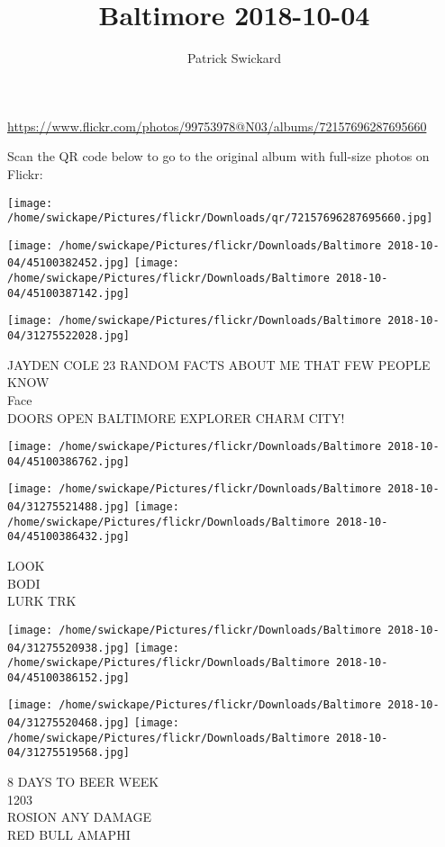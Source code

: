 \documentclass[10pt,letterpaper]{article}
\title{Baltimore 2018-10-04}
\author{Patrick Swickard}
\date{}
\begin{document}
\maketitle

\url{https://www.flickr.com/photos/99753978@N03/albums/72157696287695660}

Scan the QR code below to go to the original album with full-size photos on Flickr:

\texttt{[image: /home/swickape/Pictures/flickr/Downloads/qr/72157696287695660.jpg]}
\pagebreak

\texttt{[image: /home/swickape/Pictures/flickr/Downloads/Baltimore 2018-10-04/45100382452.jpg]}
\texttt{[image: /home/swickape/Pictures/flickr/Downloads/Baltimore 2018-10-04/45100387142.jpg]}

\texttt{[image: /home/swickape/Pictures/flickr/Downloads/Baltimore 2018-10-04/31275522028.jpg]}

JAYDEN COLE 23 RANDOM FACTS ABOUT ME THAT FEW PEOPLE KNOW\\
Face\\
DOORS OPEN BALTIMORE EXPLORER CHARM CITY!
\pagebreak

\texttt{[image: /home/swickape/Pictures/flickr/Downloads/Baltimore 2018-10-04/45100386762.jpg]}

\vspace{0.25in}
\texttt{[image: /home/swickape/Pictures/flickr/Downloads/Baltimore 2018-10-04/31275521488.jpg]}
\texttt{[image: /home/swickape/Pictures/flickr/Downloads/Baltimore 2018-10-04/45100386432.jpg]}

LOOK\\
BODI\\
LURK TRK
\pagebreak

\texttt{[image: /home/swickape/Pictures/flickr/Downloads/Baltimore 2018-10-04/31275520938.jpg]}
\texttt{[image: /home/swickape/Pictures/flickr/Downloads/Baltimore 2018-10-04/45100386152.jpg]}

\texttt{[image: /home/swickape/Pictures/flickr/Downloads/Baltimore 2018-10-04/31275520468.jpg]}
\texttt{[image: /home/swickape/Pictures/flickr/Downloads/Baltimore 2018-10-04/31275519568.jpg]}

8 DAYS TO BEER WEEK\\
1203\\
ROSION ANY DAMAGE\\
RED BULL AMAPHI
\pagebreak
\end{document}
